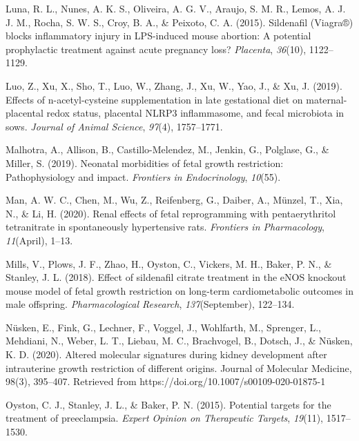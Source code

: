 \documentclass[authordate, empirical]{jote-new-article}
\begin{document}
	Luna, R. L., Nunes, A. K. S., Oliveira, A. G. V., Araujo, S. M. R., Lemos, A. J. J. M., Rocha, S. W. S., Croy, B. A., \& Peixoto, C. A. (2015). Sildenafil (Viagra®) blocks inflammatory injury in LPS-induced mouse abortion: A potential prophylactic treatment against acute pregnancy loss? \emph{Placenta}, \emph{36}(10), 1122--1129.



	Luo, Z., Xu, X., Sho, T., Luo, W., Zhang, J., Xu, W., Yao, J., \& Xu, J. (2019). Effects of n-acetyl-cysteine supplementation in late gestational diet on maternal-placental redox status, placental NLRP3 inflammasome, and fecal microbiota in sows. \emph{Journal of Animal Science}, \emph{97}(4), 1757--1771.



	Malhotra, A., Allison, B., Castillo-Melendez, M., Jenkin, G., Polglase, G., \& Miller, S. (2019). Neonatal morbidities of fetal growth restriction: Pathophysiology and impact. \emph{Frontiers in Endocrinology}, \emph{10}(55).



	Man, A. W. C., Chen, M., Wu, Z., Reifenberg, G., Daiber, A., Münzel, T., Xia, N., \& Li, H. (2020). Renal effects of fetal reprogramming with pentaerythritol tetranitrate in spontaneously hypertensive rats. \emph{Frontiers in Pharmacology}, \emph{11}(April), 1--13.



	Mills, V., Plows, J. F., Zhao, H., Oyston, C., Vickers, M. H., Baker, P. N., \& Stanley, J. L. (2018). Effect of sildenafil citrate treatment in the eNOS knockout mouse model of fetal growth restriction on long-term cardiometabolic outcomes in male offspring. \emph{Pharmacological Research}, \emph{137}(September), 122--134.



	Nüsken, E., Fink, G., Lechner, F., Voggel, J., Wohlfarth, M., Sprenger, L., Mehdiani, N., Weber, L. T., Liebau, M. C., Brachvogel, B., Dotsch, J., \& Nüsken, K. D. (2020). Altered molecular signatures during kidney development after intrauterine growth restriction of different origins. Journal of Molecular Medicine, 98(3), 395--407. Retrieved from https://doi.org/10.1007/s00109-020-01875-1



	Oyston, C. J., Stanley, J. L., \& Baker, P. N. (2015). Potential targets for the treatment of preeclampsia. \emph{Expert Opinion on Therapeutic Targets}, \emph{19}(11), 1517--1530.
\end{document}
